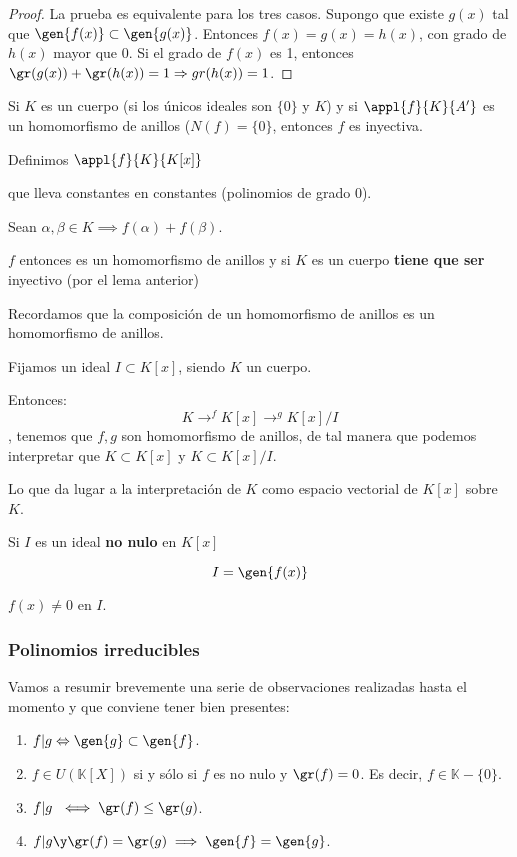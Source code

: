 \documentclass[nochap]{apuntes}
\begin{document}
\begin{proof}
La prueba es equivalente para los tres casos. Supongo que existe $g(x)$ tal que $\gen{f(x)} \subset  \gen{g(x)}$. Entonces $f(x)=g(x)=h(x)$, con grado de $h(x)$ mayor que 0.
  Si el grado de $f(x)$ es 1, entonces $\gr(g(x))+\gr(h(x))=1 \Rightarrow  gr(h(x))=1$.
\end{proof}

\begin{lemma}
Si $K$ es un cuerpo (si los únicos ideales son $\{0\}$ y $K$) y si $\appl{f}{K}{A'}$ es un homomorfismo de anillos ($N(f) = \{0\}$, entonces $f$ es inyectiva.
\end{lemma}

\begin{example}
Definimos $\appl{f}{K}{K[x]}$

que lleva constantes en constantes (polinomios de grado 0).

Sean $\alpha,\beta \in K \implies f(\alpha) + f(\beta)$.

$f$ entonces es un homomorfismo de anillos y si $K$ es un cuerpo \textbf{tiene que ser} inyectivo (por el lema anterior)
\end{example}

Recordamos que la composición de un homomorfismo de anillos es un homomorfismo de anillos.

\begin{example}

Fijamos un ideal $I\subset K[x]$, siendo $K$ un cuerpo. 

Entonces:
\[K \to^f K[x] \to^g K[x]/I\], tenemos que $f,g$ son homomorfismo de anillos, de tal manera que podemos interpretar que $K\subset K[x]$ y $K\subset K[x]/I$.

Lo que da lugar a la interpretación de $K$ como espacio vectorial de $K[x]$ sobre $K$.
\end{example}

Si $I$ es un ideal \textbf{no nulo} en $K[x]$

\[I = \gen{f(x)}\]

$f(x) \neq 0$ en $I$.

\subsubsection{Polinomios irreducibles}
Vamos a resumir brevemente una serie de observaciones realizadas hasta el momento y que conviene tener bien presentes:
\begin{enumerate}
 \item $f|g \Leftrightarrow  \gen{g} \subset \gen{f}$.
 \item $f\in  U(\mathbb{K}[X])$ si y sólo si $f$ es no nulo y $\gr(f)=0$. Es decir, $f \in \mathbb{K}-\{0\}$.
 \item $f|g \iff \gr(f) \leq \gr(g)$.
 \item $f|g \y  \gr(f)=\gr(g) \implies  \gen{f}=\gen{g}$.
\end{enumerate}
\end{document}
